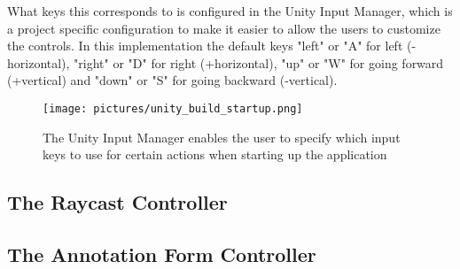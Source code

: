 What keys this corresponds to is configured in the Unity Input Manager, which is a project specific configuration to make it easier to allow the users to customize the 
controls. In this implementation the default keys "left" or "A" for left (-horizontal), "right" or "D" for right (+horizontal), 
"up" or "W" for going forward (+vertical) and "down" or "S" for going backward (-vertical).  

\begin{figure}
\label{fig:unity_build_startup}
\texttt{[image: pictures/unity\_build\_startup.png]}
\caption[The Unity Input Manager enable startup configuration]{The Unity Input Manager enables the user to specify which input keys to use for certain actions
when starting up the application}
\end{figure}


\subsection{The Raycast Controller}

\subsection{The Annotation Form Controller}
